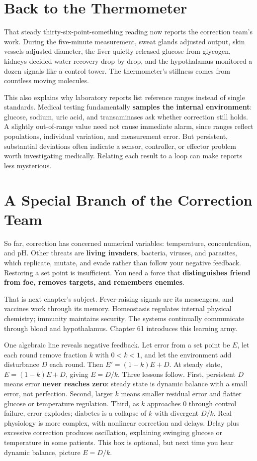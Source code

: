 \section{Back to the Thermometer}

That steady thirty-six-point-something reading now reports the correction team's work. During the five-minute measurement, sweat glands adjusted output, skin vessels adjusted diameter, the liver quietly released glucose from glycogen, kidneys decided water recovery drop by drop, and the hypothalamus monitored a dozen signals like a control tower. The thermometer's stillness comes from countless moving molecules.

This also explains why laboratory reports list reference ranges instead of single standards. Medical testing fundamentally \textbf{samples the internal environment}: glucose, sodium, uric acid, and transaminases ask whether correction still holds. A slightly out-of-range value need not cause immediate alarm, since ranges reflect populations, individual variation, and measurement error. But persistent, substantial deviations often indicate a sensor, controller, or effector problem worth investigating medically. Relating each result to a loop can make reports less mysterious.

\section{A Special Branch of the Correction Team}

So far, correction has concerned numerical variables: temperature, concentration, and pH. Other threats are \textbf{living invaders}, bacteria, viruses, and parasites, which replicate, mutate, and evade rather than follow your negative feedback. Restoring a set point is insufficient. You need a force that \textbf{distinguishes friend from foe, removes targets, and remembers enemies}.

That is next chapter's subject. Fever-raising signals are its messengers, and vaccines work through its memory. Homeostasis regulates internal physical chemistry; immunity maintains security. The systems continually communicate through blood and hypothalamus. Chapter 61 introduces this learning army.

\begin{tiaozhan}
One algebraic line reveals negative feedback. Let error from a set point be $E$, let each round remove fraction $k$ with $0<k<1$, and let the environment add disturbance $D$ each round. Then $E' = (1-k)E + D$. At steady state, $E = (1-k)E + D$, giving $E = D/k$. Three lessons follow. First, persistent $D$ means error \textbf{never reaches zero}: steady state is dynamic balance with a small error, not perfection. Second, larger $k$ means smaller residual error and flatter glucose or temperature regulation. Third, as $k$ approaches $0$ through control failure, error explodes; diabetes is a collapse of $k$ with divergent $D/k$. Real physiology is more complex, with nonlinear correction and delays. Delay plus excessive correction produces oscillation, explaining swinging glucose or temperature in some patients. This box is optional, but next time you hear dynamic balance, picture $E=D/k$.
\end{tiaozhan}

